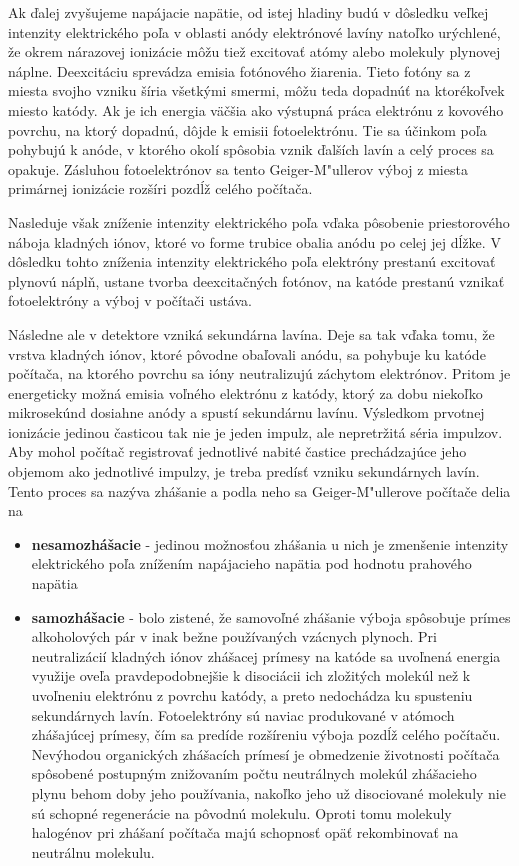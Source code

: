 \documentclass[../../main.tex]{subfiles}
\begin{document}
Ak ďalej zvyšujeme napájacie napätie, od istej hladiny budú v dôsledku veľkej intenzity elektrického poľa v oblasti anódy elektrónové lavíny natoľko urýchlené, že okrem nárazovej ionizácie môžu tiež excitovať atómy alebo molekuly plynovej náplne. Deexcitáciu sprevádza emisia fotónového žiarenia. Tieto fotóny sa z miesta svojho vzniku šíria všetkými smermi, môžu teda dopadnúť na ktorékoľvek miesto katódy. Ak je ich energia väčšia ako výstupná práca elektrónu z kovového povrchu, na ktorý dopadnú, dôjde k emisii fotoelektrónu. Tie sa účinkom poľa pohybujú k anóde, v ktorého okolí spôsobia vznik ďalších lavín a celý proces sa opakuje. Zásluhou fotoelektrónov sa tento Geiger-M"ullerov výboj z miesta primárnej ionizácie rozšíri pozdĺž celého počítača.

Nasleduje však zníženie intenzity elektrického poľa vďaka pôsobenie priestorového náboja kladných iónov, ktoré vo forme trubice obalia anódu po celej jej dĺžke. V dôsledku tohto zníženia intenzity elektrického poľa elektróny prestanú excitovať plynovú náplň, ustane tvorba deexcitačných fotónov, na katóde prestanú vznikať fotoelektróny a výboj v počítači ustáva. 

Následne ale v detektore vzniká sekundárna lavína. Deje sa tak vďaka tomu, že vrstva kladných iónov, ktoré pôvodne obaľovali anódu, sa pohybuje ku katóde počítača, na ktorého povrchu sa ióny neutralizujú záchytom elektrónov. Pritom je energeticky možná emisia voľného elektrónu z katódy, ktorý za dobu niekoľko mikrosekúnd dosiahne anódy a spustí sekundárnu lavínu. Výsledkom prvotnej ionizácie jedinou časticou tak nie je jeden impulz, ale nepretržitá séria impulzov. Aby mohol počítač registrovať jednotlivé nabité častice prechádzajúce jeho objemom ako jednotlivé impulzy, je treba predísť vzniku sekundárnych lavín. Tento proces sa nazýva zhášanie a podla neho sa Geiger-M"ullerove počítače delia na
\begin{itemize}
\item \textbf{nesamozhášacie} - jedinou možnosťou zhášania u nich je zmenšenie intenzity elektrického poľa znížením napájacieho napätia pod hodnotu prahového napätia
\item \textbf{samozhášacie} - bolo zistené, že samovoľné zhášanie výboja spôsobuje prímes alkoholových pár v inak bežne používaných vzácnych plynoch. Pri neutralizácií kladných iónov zhášacej prímesy na katóde sa uvoľnená energia využije oveľa pravdepodobnejšie k disociácii ich zložitých molekúl než k uvoľneniu elektrónu z povrchu katódy, a preto nedochádza ku spusteniu sekundárnych lavín. Fotoelektróny sú naviac produkované v atómoch zhášajúcej prímesy, čím sa predíde rozšíreniu výboja pozdĺž celého počítaču. Nevýhodou organických zhášacích prímesí je obmedzenie životnosti počítača spôsobené postupným znižovaním počtu neutrálnych molekúl zhášacieho plynu behom doby jeho používania, nakoľko jeho už disociované molekuly nie sú schopné regenerácie na pôvodnú molekulu. Oproti tomu molekuly halogénov pri zhášaní počítača majú schopnosť opäť rekombinovať na neutrálnu molekulu.
\end{itemize}
\end{document}
